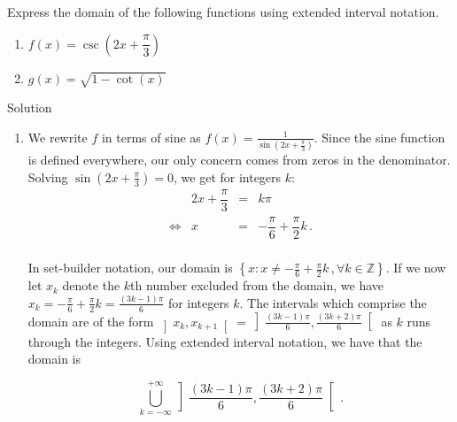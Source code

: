 \begin{example}  \label{TrigDomainEx1} Express the domain of the following functions using extended interval notation.
	\begin{multicols}{2}
		\begin{enumerate}
			
			\item  $f(x) = \csc\left(2x + \dfrac{\pi}{3}\right)$
			\item  $g(x) = \sqrt{1 - \cot(x)}$
			
		\end{enumerate}
		
	\end{multicols}
	
	Solution 
	
	\begin{enumerate}
		
		\item  We rewrite $f$ in terms of sine as $f(x) = \frac{1}{\sin\left(2x + \frac{\pi}{3}\right)}$.  Since the sine function is defined everywhere, our only concern comes from zeros in the denominator.  Solving $\sin\left(2x + \frac{\pi}{3}\right) = 0$, we get for integers $k$:
		\renewcommand{\arraystretch}{1}%
		\[ \begin{array}{rrcl}
		&2x +\dfrac{\pi}{3} &=& k\pi  \\
		\Leftrightarrow&x &=& -\dfrac{\pi}{6} + \dfrac{\pi}{2} k \,. \\ \end{array} \]
		
		In set-builder notation, our domain is  $\left\{ x : x \neq  -\frac{\pi}{6} + \frac{\pi}{2} k \,, \forall k\in\mathbb{Z} \right\}$. If we now  let $x_k$ denote the $k$th number excluded from the domain, we have  $x_k = -\frac{\pi}{6} + \frac{\pi}{2} k = \frac{(3k-1)\pi}{6}$ for integers $k$.  The intervals which comprise the domain are of the form $\left]x_k, x_{k+1}  \right[ = \left]\frac{(3k-1)\pi}{6}, \frac{(3k+2)\pi}{6} \right[$ as $k$ runs through the integers.  Using extended interval notation, we have that the domain is
		
		\[ \bigcup_{k = -\infty}^{+\infty}  \left]\dfrac{(3k-1)\pi}{6}, \dfrac{(3k+2)\pi}{6} \right[\,.\]
		

\end{enumerate}
\end{example}
